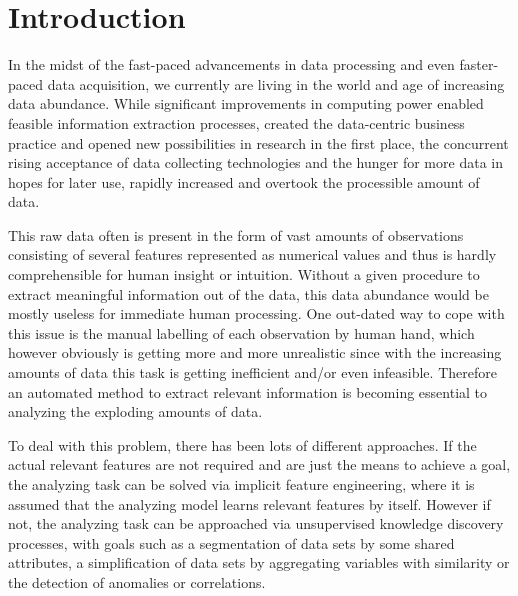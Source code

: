 \chapter{Introduction}\label{ch:intro}

In the midst of the fast-paced advancements in data processing and even faster-paced data acquisition, we currently are living in the world and age of increasing data abundance. While significant improvements in computing power enabled feasible information extraction processes, created the data-centric business practice and opened new possibilities in research in the first place, the concurrent rising acceptance of data collecting technologies and the hunger for more data in hopes for later use, rapidly increased and overtook the processible amount of data. 

This raw data often is present in the form of vast amounts of observations consisting of several features represented as numerical values and thus is hardly comprehensible for human insight or intuition. Without a given procedure to extract meaningful information out of the data, this data abundance would be mostly useless for immediate human processing. One out-dated way to cope with this issue is the manual labelling of each observation by human hand, which however obviously is getting more and more unrealistic since with the increasing amounts of data this task is getting inefficient and/or even infeasible. Therefore an automated method to extract relevant information is becoming essential to analyzing the exploding amounts of data. %

To deal with this problem, there has been lots of different approaches.
If the actual relevant features are not required and are just the means to achieve a goal, the analyzing task can be solved via implicit feature engineering, where it is assumed that the analyzing model learns relevant features by itself.
However if not, the analyzing task can be approached via unsupervised knowledge discovery processes, with goals such as a segmentation of data sets by some shared attributes, a simplification of data sets by aggregating variables with similarity or the detection of anomalies or correlations.

